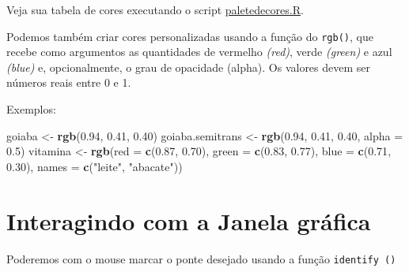 \documentclass[]{book}
\newenvironment{Shaded}{\begin{snugshade}}{\end{snugshade}}
\newcommand{\DataTypeTok}[1]{\textcolor[rgb]{0.13,0.29,0.53}{#1}}
\newcommand{\DecValTok}[1]{\textcolor[rgb]{0.00,0.00,0.81}{#1}}
\newcommand{\FloatTok}[1]{\textcolor[rgb]{0.00,0.00,0.81}{#1}}
\newcommand{\KeywordTok}[1]{\textcolor[rgb]{0.13,0.29,0.53}{\textbf{#1}}}
\newcommand{\NormalTok}[1]{#1}
\newcommand{\OperatorTok}[1]{\textcolor[rgb]{0.81,0.36,0.00}{\textbf{#1}}}
\newcommand{\StringTok}[1]{\textcolor[rgb]{0.31,0.60,0.02}{#1}}
\begin{document}
Veja sua tabela de cores executando o script \href{https://www.dropbox.com/s/e9a27z97buqjovz/paletadecores.R?dl=1}{paletedecores.R}.

Podemos também criar cores personalizadas usando a função do \texttt{rgb()}, que recebe como argumentos as quantidades de vermelho \emph{(red)}, verde \emph{(green)} e azul \emph{(blue)} e, opcionalmente, o grau de opacidade (alpha). Os valores devem ser números reais entre 0 e 1.

Exemplos:

\begin{Shaded}
\begin{Highlighting}[]
\NormalTok{goiaba <-}\StringTok{ }\KeywordTok{rgb}\NormalTok{(}\FloatTok{0.94}\NormalTok{, }\FloatTok{0.41}\NormalTok{, }\FloatTok{0.40}\NormalTok{)}
\NormalTok{goiaba.semitrans <-}\StringTok{ }\KeywordTok{rgb}\NormalTok{(}\FloatTok{0.94}\NormalTok{, }\FloatTok{0.41}\NormalTok{, }\FloatTok{0.40}\NormalTok{, }\DataTypeTok{alpha =} \FloatTok{0.5}\NormalTok{)}
\NormalTok{vitamina <-}\StringTok{ }\KeywordTok{rgb}\NormalTok{(}\DataTypeTok{red =} \KeywordTok{c}\NormalTok{(}\FloatTok{0.87}\NormalTok{, }\FloatTok{0.70}\NormalTok{), }\DataTypeTok{green =} \KeywordTok{c}\NormalTok{(}\FloatTok{0.83}\NormalTok{, }\FloatTok{0.77}\NormalTok{),}
\DataTypeTok{blue =} \KeywordTok{c}\NormalTok{(}\FloatTok{0.71}\NormalTok{, }\FloatTok{0.30}\NormalTok{), }\DataTypeTok{names =} \KeywordTok{c}\NormalTok{(}\StringTok{"leite"}\NormalTok{, }\StringTok{"abacate"}\NormalTok{))}
\end{Highlighting}
\end{Shaded}

\hypertarget{interagindo-com-a-janela-grafica}{%
\section{Interagindo com a Janela gráfica}\label{interagindo-com-a-janela-grafica}}

Poderemos com o mouse marcar o ponte desejado usando a função \texttt{identify\ ()}

\begin{Shaded}
\end{Shaded}
\end{document}
